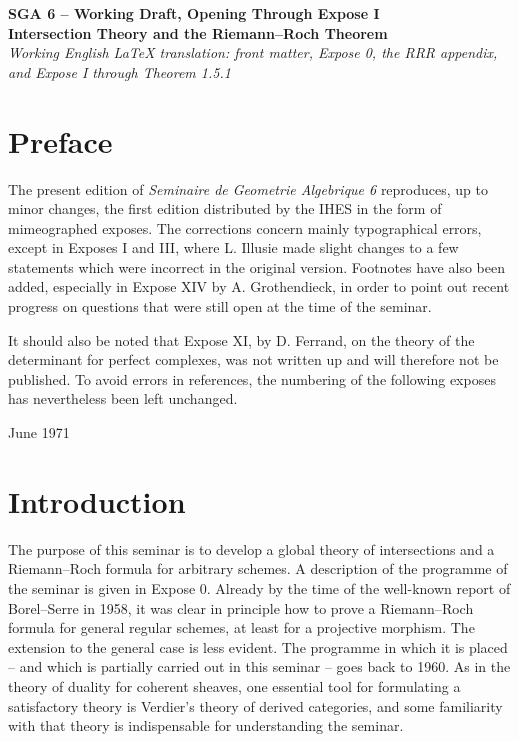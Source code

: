 \documentclass[14pt]{extarticle}
\begin{document}
\begin{center}
{\Large \textbf{SGA 6 -- Working Draft, Opening Through Expose I}}\\[0.35em]
{\large \textbf{Intersection Theory and the Riemann--Roch Theorem}}\\[0.25em]
\emph{Working English LaTeX translation: front matter, Expose 0, the RRR appendix, and Expose I through Theorem 1.5.1}
\end{center}

\bigskip

\tableofcontents
\newpage

\section*{Preface}

The present edition of \emph{Seminaire de Geometrie Algebrique 6} reproduces, up to minor changes, the first edition distributed by the IHES in the form of mimeographed exposes. The corrections concern mainly typographical errors, except in Exposes I and III, where L. Illusie made slight changes to a few statements which were incorrect in the original version. Footnotes have also been added, especially in Expose XIV by A. Grothendieck, in order to point out recent progress on questions that were still open at the time of the seminar.

It should also be noted that Expose XI, by D. Ferrand, on the theory of the determinant for perfect complexes, was not written up and will therefore not be published. To avoid errors in references, the numbering of the following exposes has nevertheless been left unchanged.

\begin{flushright}
June 1971
\end{flushright}

\section*{Introduction}

The purpose of this seminar is to develop a global theory of intersections and a Riemann--Roch formula for arbitrary schemes. A description of the programme of the seminar is given in Expose 0. Already by the time of the well-known report of Borel--Serre in 1958, it was clear in principle how to prove a Riemann--Roch formula for general regular schemes, at least for a projective morphism. The extension to the general case is less evident. The programme in which it is placed -- and which is partially carried out in this seminar -- goes back to 1960. As in the theory of duality for coherent sheaves, one essential tool for formulating a satisfactory theory is Verdier's theory of derived categories, and some familiarity with that theory is indispensable for understanding the seminar.
\end{document}
